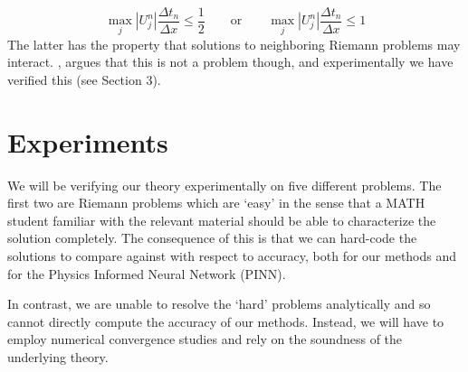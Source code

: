 \documentclass{myproject}
\begin{document}
\begin{equation}
    \max_{j} |U_j^n| \frac{\Delta t_n}{\Delta x} \leq \frac{1}{2} \qquad \text{or} \qquad \max_{j} |U_j^n| \frac{\Delta t_n}{\Delta x} \leq 1
\end{equation}
The latter has the property that solutions to neighboring Riemann problems may interact. \Cite{leveque1985}, argues that this is not a problem though, and experimentally we have verified this (see Section 3).

\section{Experiments}

We will be verifying our theory experimentally on five different problems. The first two are Riemann problems which are `easy' in the sense that a MATH student familiar with the relevant material should be able to characterize the solution completely. The consequence of this is that we can hard-code the solutions to compare against with respect to accuracy, both for our methods and for the Physics Informed Neural Network (PINN).

In contrast, we are unable to resolve the `hard' problems analytically and so cannot directly compute the accuracy of our methods. Instead, we will have to employ numerical convergence studies and rely on the soundness of the underlying theory.
\end{document}
